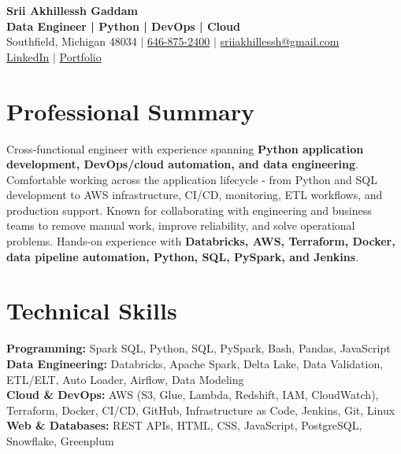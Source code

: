 \documentclass[letterpaper,10pt]{article}
\begin{document}
\fontsize{9.35pt}{10.45pt}\selectfont

\begin{center}
    {\LARGE \textbf{Srii Akhillessh Gaddam}} \\[-1pt]
    \textbf{Data Engineer | Python | DevOps | Cloud} \\[2pt]
    Southfield, Michigan 48034 $|$
    \href{tel:6468752400}{646-875-2400} $|$
    \href{mailto:sriiakhillessh@gmail.com}{sriiakhillessh@gmail.com} \\[1pt]
    \href{https://www.linkedin.com/in/srii-akhiilessh-gaddam-b48668191/}{LinkedIn} $|$
    \href{https://sriiakhillesshg.github.io/portfolio/}{Portfolio}
\end{center}
\vspace{-8pt}

\section{Professional Summary}
\small{Cross-functional engineer with experience spanning \textbf{Python application development, DevOps/cloud automation, and data engineering}. Comfortable working across the application lifecycle - from Python and SQL development to AWS infrastructure, CI/CD, monitoring, ETL workflows, and production support. Known for collaborating with engineering and business teams to remove manual work, improve reliability, and solve operational problems. Hands-on experience with \textbf{Databricks, AWS, Terraform, Docker, data pipeline automation, Python, SQL, PySpark, and Jenkins}.}

\section{Technical Skills}
\small{
\textbf{Programming:} Spark SQL, Python, SQL, PySpark, Bash, Pandas, JavaScript \\
\textbf{Data Engineering:} Databricks, Apache Spark, Delta Lake, Data Validation, ETL/ELT, Auto Loader, Airflow, Data Modeling \\
\textbf{Cloud \& DevOps:} AWS (S3, Glue, Lambda, Redshift, IAM, CloudWatch), Terraform, Docker, CI/CD, GitHub, Infrastructure as Code, Jenkins, Git, Linux \\
\textbf{Web \& Databases:} REST APIs, HTML, CSS, JavaScript, PostgreSQL, Snowflake, Greenplum
}
\end{document}
